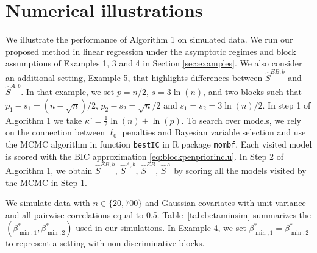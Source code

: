 \documentclass[aos]{imsart}
\theoremstyle{plain}
\newcommand{\paul}[1]{{\small{\color{green} \sf $\spadesuit$ Paul: #1}}}
\begin{document}

\section{Numerical illustrations}\label{sec:simulation}

We illustrate the performance of Algorithm 1 on simulated data. We run our proposed method in linear regression under the asymptotic regimes and block assumptions of Examples 1, 3 and 4 in Section \ref{sec:examples}. We also consider an additional setting, Example 5, that highlights differences between $\hat S^{EB,b}$ and $\hat S^{A,b}$. In that example, we set $p=n/2$, $s=3\ln(n)$, and two blocks such that $p_1-s_1=(n-\sqrt{n})/2$, $p_2-s_2=\sqrt{n}/2$ and $s_1 = s_2=3\ln(n)/2$. In step 1 of Algorithm 1 we take $\kappa^{\circ}=\frac12\ln(n)+\ln(p)$. 
To search over models, we rely on \color{black}
the connection between $\ell_0$ penalties and Bayesian variable selection and %
use the MCMC algorithm in function \texttt{bestIC} in R package \texttt{mombf}. Each visited model is 
scored with the BIC approximation \eqref{eq:blockpenpriorinclu}. In Step 2 of Algorithm 1, we obtain $\hat S^{EB,b}$, $\hat S^{A,b}$, $\hat S^{EB}$, $\hat S^{A}$ by scoring all the models visited by the MCMC in Step 1.

We simulate data with $n \in \{20,700\}$ and Gaussian covariates with unit variance and all pairwise correlations equal to 0.5. \color{black}
Table~\ref{tab:betaminsim} summarizes the $(\beta_{\min,1}^*,\beta_{\min,2}^*)$ %
used in our simulations. %
In Example 4, we set $\beta_{\min,1}^*=\beta_{\min,2}^*$ to represent a setting with non-discriminative blocks. %
\end{document}
